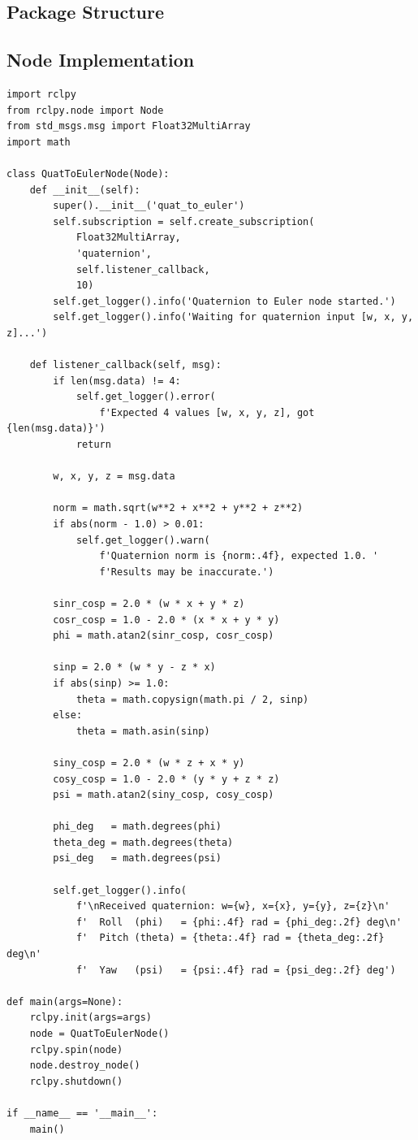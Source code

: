 \documentclass[12pt]{article}
\begin{document}
\subsection{Package Structure}

\subsection{Node Implementation}

\begin{lstlisting}
import rclpy
from rclpy.node import Node
from std_msgs.msg import Float32MultiArray
import math

class QuatToEulerNode(Node):
    def __init__(self):
        super().__init__('quat_to_euler')
        self.subscription = self.create_subscription(
            Float32MultiArray,
            'quaternion',
            self.listener_callback,
            10)
        self.get_logger().info('Quaternion to Euler node started.')
        self.get_logger().info('Waiting for quaternion input [w, x, y, z]...')

    def listener_callback(self, msg):
        if len(msg.data) != 4:
            self.get_logger().error(
                f'Expected 4 values [w, x, y, z], got {len(msg.data)}')
            return

        w, x, y, z = msg.data

        norm = math.sqrt(w**2 + x**2 + y**2 + z**2)
        if abs(norm - 1.0) > 0.01:
            self.get_logger().warn(
                f'Quaternion norm is {norm:.4f}, expected 1.0. '
                f'Results may be inaccurate.')

        sinr_cosp = 2.0 * (w * x + y * z)
        cosr_cosp = 1.0 - 2.0 * (x * x + y * y)
        phi = math.atan2(sinr_cosp, cosr_cosp)

        sinp = 2.0 * (w * y - z * x)
        if abs(sinp) >= 1.0:
            theta = math.copysign(math.pi / 2, sinp)
        else:
            theta = math.asin(sinp)

        siny_cosp = 2.0 * (w * z + x * y)
        cosy_cosp = 1.0 - 2.0 * (y * y + z * z)
        psi = math.atan2(siny_cosp, cosy_cosp)

        phi_deg   = math.degrees(phi)
        theta_deg = math.degrees(theta)
        psi_deg   = math.degrees(psi)

        self.get_logger().info(
            f'\nReceived quaternion: w={w}, x={x}, y={y}, z={z}\n'
            f'  Roll  (phi)   = {phi:.4f} rad = {phi_deg:.2f} deg\n'
            f'  Pitch (theta) = {theta:.4f} rad = {theta_deg:.2f} deg\n'
            f'  Yaw   (psi)   = {psi:.4f} rad = {psi_deg:.2f} deg')

def main(args=None):
    rclpy.init(args=args)
    node = QuatToEulerNode()
    rclpy.spin(node)
    node.destroy_node()
    rclpy.shutdown()

if __name__ == '__main__':
    main()
\end{lstlisting}
\end{document}
